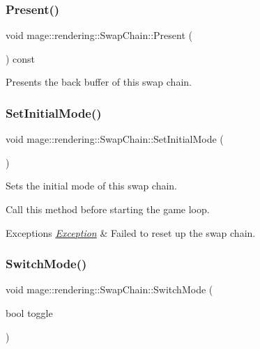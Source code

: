 \subsubsection{\texorpdfstring{Present()}{Present()}}
{\footnotesize\ttfamily void mage\+::rendering\+::\+Swap\+Chain\+::\+Present (\begin{DoxyParamCaption}{ }\end{DoxyParamCaption}) const\hspace{0.3cm}{\ttfamily [noexcept]}}

Presents the back buffer of this swap chain. \hypertarget{classmage_1_1rendering_1_1_swap_chain_a7ceec40e9007d1d6be3bdcd003fe9985}{}\label{classmage_1_1rendering_1_1_swap_chain_a7ceec40e9007d1d6be3bdcd003fe9985} 
\subsubsection{\texorpdfstring{Set\+Initial\+Mode()}{SetInitialMode()}}
{\footnotesize\ttfamily void mage\+::rendering\+::\+Swap\+Chain\+::\+Set\+Initial\+Mode (\begin{DoxyParamCaption}{ }\end{DoxyParamCaption})}

Sets the initial mode of this swap chain.

Call this method before starting the game loop.


\begin{DoxyExceptions}{Exceptions}
{\em \hyperlink{classmage_1_1_exception}{Exception}} & Failed to reset up the swap chain. \\
\hline
\end{DoxyExceptions}
\hypertarget{classmage_1_1rendering_1_1_swap_chain_a184b5aa11bdc69f7b6077de9ec0c47e0}{}\label{classmage_1_1rendering_1_1_swap_chain_a184b5aa11bdc69f7b6077de9ec0c47e0} 
\subsubsection{\texorpdfstring{Switch\+Mode()}{SwitchMode()}}
{\footnotesize\ttfamily void mage\+::rendering\+::\+Swap\+Chain\+::\+Switch\+Mode (\begin{DoxyParamCaption}\item[{bool}]{toggle }\end{DoxyParamCaption})}

